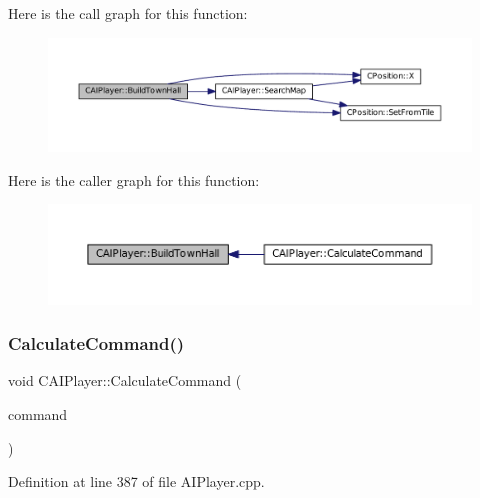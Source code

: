 Here is the call graph for this function\+:\nopagebreak
\begin{figure}[H]
\begin{center}
\leavevmode
\includegraphics[width=350pt]{classCAIPlayer_a41cdefbe14210fb70b793a32778c5141_cgraph}
\end{center}
\end{figure}
Here is the caller graph for this function\+:\nopagebreak
\begin{figure}[H]
\begin{center}
\leavevmode
\includegraphics[width=350pt]{classCAIPlayer_a41cdefbe14210fb70b793a32778c5141_icgraph}
\end{center}
\end{figure}
\hypertarget{classCAIPlayer_ae2742efd250c7d6c00b659ccc29c4be3}{}\label{classCAIPlayer_ae2742efd250c7d6c00b659ccc29c4be3} 
\subsubsection{\texorpdfstring{Calculate\+Command()}{CalculateCommand()}}
{\footnotesize\ttfamily void C\+A\+I\+Player\+::\+Calculate\+Command (\begin{DoxyParamCaption}\item[{\hyperlink{structSPlayerCommandRequest}{S\+Player\+Command\+Request} \&}]{command }\end{DoxyParamCaption})}



Definition at line 387 of file A\+I\+Player.\+cpp.


